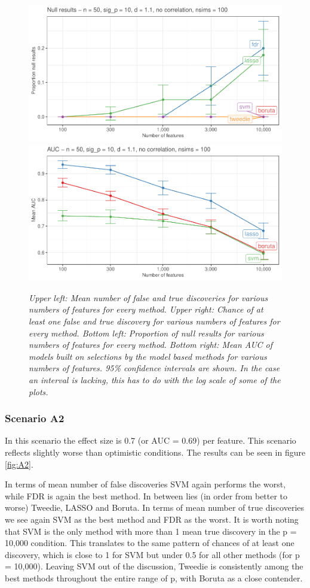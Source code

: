 \documentclass[
]{article}
\begin{document}
\begin{figure}

{\centering \includegraphics[width=0.49\linewidth]{main_files/figure-latex/A1-1} \includegraphics[width=0.49\linewidth]{main_files/figure-latex/A1-2} 

}

\caption{\textit{Upper left: Mean number of false and true discoveries for various numbers of features for every method. Upper right: Chance of at least one false and true discovery for various numbers of features for every method. Bottom left: Proportion of null results for various numbers of features for every method. Bottom right: Mean AUC of models built on selections by the model based methods for various numbers of features. 95\% confidence intervals are shown. In the case an interval is lacking, this has to do with the log scale of some of the plots.}}\label{fig:A1}
\end{figure}

\hypertarget{scenario-a2}{%
\subsubsection{Scenario A2}\label{scenario-a2}}

In this scenario the effect size is 0.7 (or AUC = 0.69) per feature. This scenario reflects slightly worse than optimistic conditions. The results can be seen in figure \ref{fig:A2}.

In terms of mean number of false discoveries SVM again performs the worst, while FDR is again the best method. In between lies (in order from better to worse) Tweedie, LASSO and Boruta. In terms of mean number of true discoveries we see again SVM as the best method and FDR as the worst. It is worth noting that SVM is the only method with more than 1 mean true discovery in the p = 10,000 condition. This translates to the same pattern of chances of at least one discovery, which is close to 1 for SVM but under 0.5 for all other methods (for p = 10,000). Leaving SVM out of the discussion, Tweedie is consistently among the best methods throughout the entire range of p, with Boruta as a close contender.
\end{document}
